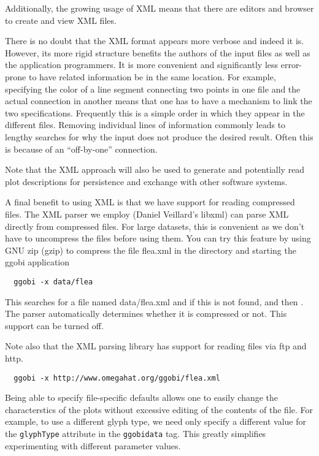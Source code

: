 \documentclass{article}
\def\directory#1{\dir{#1}}
\begin{document}
Additionally, the growing usage of XML means that there are editors
and browser to create and view XML files.

There is no doubt that the XML format appears more verbose and indeed
it is. However, its more rigid structure benefits the authors of the
input files as well as the application programmers.  It is more
convenient and significantly less error-prone to have related
information be in the same location.  For example, specifying the
color of a line segment connecting two points in one file and the
actual connection in another means that one has to have a mechanism to
link the two specifications. Frequently this is a simple order in
which they appear in the different files.  Removing individual lines
of information commonly leads to lengthy searches for why the input
does not produce the desired result.  Often this is because of an
``off-by-one'' connection.


Note that the XML approach will also be used to generate and
potentially read plot descriptions for persistence and exchange with
other software systems.


A final benefit to using XML is that we have support for reading
compressed files.  The XML parser we employ (Daniel Veillard's libxml)
can parse XML directly from compressed files.  For large datasets,
this is convenient as we don't have to uncompress the files before
using them.  You can try this feature by using GNU zip (gzip)
to compress the file flea.xml in the \directory{data}
directory and starting the ggobi application
\begin{verbatim}
  ggobi -x data/flea
\end{verbatim}
This searches for a file named data/flea.xml and if this is not found,
 and then .  The parser
automatically determines whether it is compressed or not.  This
support can be turned off.

Note also that the XML parsing library has support for reading files
via ftp and http.
\begin{verbatim}
  ggobi -x http://www.omegahat.org/ggobi/flea.xml
\end{verbatim}



Being able to specify file-specific defaults allows one to easily
change the characterstics of the plots without excessive editing of
the contents of the file.  For example, to use a different glyph type,
we need only specify a different value for the \texttt{glyphType}
attribute in the \texttt{ggobidata} tag.  This greatly simplifies
experimenting with different parameter values.
\end{document}
